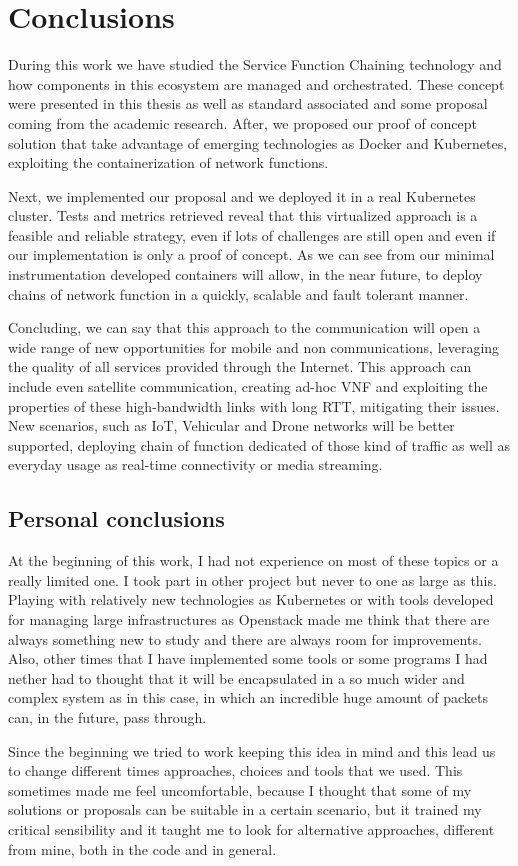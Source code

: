 \chapter{Conclusions}
\label{chap:conclusions}

During this work we have studied the Service Function Chaining
technology and how components in this ecosystem are managed and orchestrated.
These concept were presented in this thesis as well as standard associated and
some proposal coming from the academic research. After, we proposed our
proof of concept solution that take advantage of emerging technologies as Docker
and Kubernetes, exploiting the containerization of network functions.

Next, we implemented our proposal and we deployed it in a real Kubernetes
cluster. Tests and metrics retrieved reveal that this virtualized approach is a
feasible and reliable strategy, even if lots of challenges are still open and
even if our implementation is only a proof of concept. As we can see from our
minimal instrumentation developed containers will allow, in the near future, to
deploy chains of network function in a quickly, scalable and fault tolerant
manner. 

Concluding, we can say that this approach to the communication will open a wide
range of new opportunities for mobile and non communications, leveraging the
quality of all services provided through the Internet. This approach can include
even satellite communication, creating ad-hoc VNF and exploiting the properties
of these high-bandwidth links with long RTT, mitigating their issues. New
scenarios, such as IoT, Vehicular and Drone networks will be better supported,
deploying chain of function dedicated of those kind of traffic as well as
everyday usage as real-time connectivity or media streaming.

\section*{Personal conclusions}
At the beginning of this work, I had not experience on most of these topics
or a really limited one. I took part in other project but never to one as large
as this. Playing with relatively new technologies as Kubernetes or with tools
developed for managing large infrastructures as Openstack made me think that
there are always something new to study and there are always room for
improvements. Also, other times that I have implemented some tools or some
programs I had nether had to thought that it will be encapsulated in a so much
wider and complex system as in this case, in which an incredible huge amount of
packets can, in the future, pass through.

Since the beginning we tried to work keeping this idea in mind and this lead us
to change different times approaches, choices and tools that we used. This
sometimes made me feel uncomfortable, because I thought that some of my
solutions or proposals can be suitable in a certain scenario, but it trained my
critical sensibility and it taught me to look for alternative approaches,
different from mine, both in the code and in general.